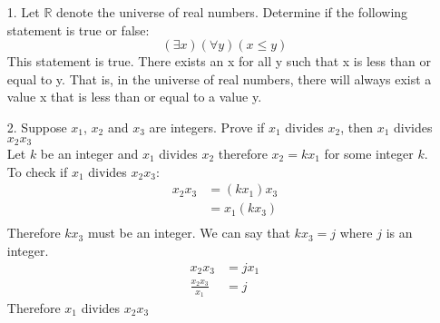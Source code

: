 \documentclass[a4paper,12pt]{article}
\begin{document}
    \begin{itemize}
      \item[1.] Let $\mathbb{R}$ denote the universe of real numbers. Determine if the following statement is true or false:
      \[
        (\exists x)(\forall y)(x \leq y)
      \]
      This statement is true. There exists an x for all y such that x is less than or equal to y. That is, in the universe of real numbers, there will always exist a value x that is less than or equal to a value y. 

      \item[2.] Suppose $x_1$, $x_2$ and $x_3$ are integers. Prove if $x_1$ divides $x_2$, then $x_1$ divides $x_2x_3$
      \\
      Let $k$ be an integer and $x_1$ divides $x_2$ therefore $x_2 = kx_1$ for some integer $k$.
      \\
      To check if $x_1$ divides $x_2x_3$:
      \begin{align*}
        x_2x_3 &= (kx_1)x_3 \\
        &= x_1(kx_3)\\
      \end{align*}
      Therefore $kx_3$ must be an integer. We can say that $kx_3 = j$ where $j$ is an integer.
      \begin{align*}
        x_2x_3 &= jx_1 \\
        \frac{x_2x_3}{x_1} &= j
      \end{align*}
      Therefore $x_1$ divides $x_2x_3$
    \end{itemize} 
\end{document}
